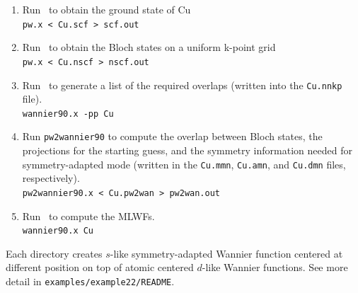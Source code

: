 \documentclass[a4paper,11pt,twoside]{article}
\begin{document}
\begin{enumerate}
\item Run \pwscf\ to obtain the ground state of Cu\\
{\tt pw.x < Cu.scf > scf.out}

\item Run \pwscf\ to obtain the Bloch states on a uniform k-point grid\\
{\tt pw.x < Cu.nscf > nscf.out}

\item Run \wannier\ to generate a list of the required overlaps (written
  into the {\tt Cu.nnkp} file).\\ 
{\tt wannier90.x -pp Cu}

\item Run {\tt pw2wannier90} to compute the overlap between Bloch
  states, the projections for the starting guess, and the symmetry information needed for symmetry-adapted mode (written in the
  {\tt Cu.mmn}, {\tt Cu.amn}, and {\tt Cu.dmn} files, respectively).\\  
{\tt pw2wannier90.x < Cu.pw2wan > pw2wan.out}

\item Run \wannier\ to compute the MLWFs.\\
{\tt wannier90.x Cu}
\end{enumerate}

Each directory creates $s$-like symmetry-adapted Wannier function centered at different position on top of atomic centered $d$-like Wannier functions. 
See more detail in {\tt examples/example22/README}. 






\end{document}
